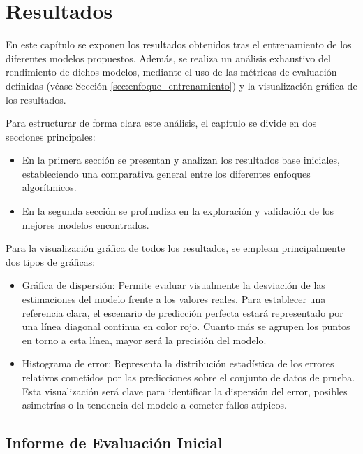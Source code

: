 \chapter{Resultados}\label{cap:resultados}
En este capítulo se exponen los resultados obtenidos tras el entrenamiento de los diferentes modelos propuestos. Además, se realiza un análisis exhaustivo del rendimiento de dichos modelos, mediante el uso de las métricas de evaluación definidas (véase Sección \ref{sec:enfoque_entrenamiento}) y la visualización gráfica de los resultados.

Para estructurar de forma clara este análisis, el capítulo se divide en dos secciones principales:
\begin{itemize}
	\item En la primera sección se presentan y analizan los resultados base iniciales, estableciendo una comparativa general entre los diferentes enfoques algorítmicos.
	\item En la segunda sección se profundiza en la exploración y validación de los mejores modelos encontrados.
\end{itemize}

Para la visualización gráfica de todos los resultados, se emplean principalmente dos tipos de gráficas:
\begin{itemize}
	\item Gráfica de dispersión: Permite evaluar visualmente la desviación de las estimaciones del modelo frente a los valores reales. Para establecer una referencia clara, el escenario de predicción perfecta estará representado por una línea diagonal continua en color rojo. Cuanto más se agrupen los puntos en torno a esta línea, mayor será la precisión del modelo.
	\item Histograma de error: Representa la distribución estadística de los errores relativos cometidos por las predicciones sobre el conjunto de datos de prueba. Esta visualización será clave para identificar la dispersión del error, posibles asimetrías o la tendencia del modelo a cometer fallos atípicos.
\end{itemize}

\section{Informe de Evaluación Inicial}

